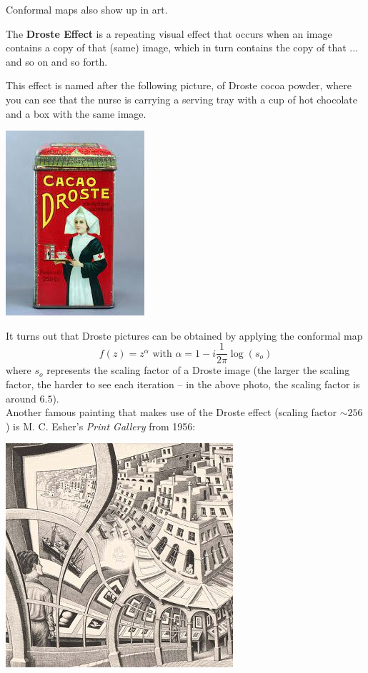 \documentclass[12pt]{amsart}
\begin{document}
Conformal maps also show up in art. 

\begin{definition}
The \textbf{Droste Effect} is a repeating visual effect that occurs when an image contains a copy of that (same) image, which in turn contains the copy of that ... and so on and so forth.
\end{definition}

This effect is named after the following picture, of Droste cocoa powder, where you can see that the nurse is carrying a serving tray with a cup of hot chocolate and a box with the same image. 

\begin{center}
\includegraphics[scale = 0.75]{note_imgs/droste_effect.jpeg}
\end{center}

It turns out that Droste pictures can be obtained by applying the conformal map \[f(z) = z^\alpha \text{ with } \alpha = 1 - i \frac{1}{2\pi} \log(s_o) \] where $s_o$ represents the scaling factor of a Droste image (the larger the scaling factor, the harder to see each iteration -- in the above photo, the scaling factor is around $6.5$). \\

Another famous painting that makes use of the Droste effect (scaling factor $\sim 256$) is M. C. Esher's \textit{Print Gallery} from 1956:

\begin{center}
\includegraphics[scale = 0.8]{note_imgs/escher_print_gallery.jpg}
\end{center}
\end{document}
